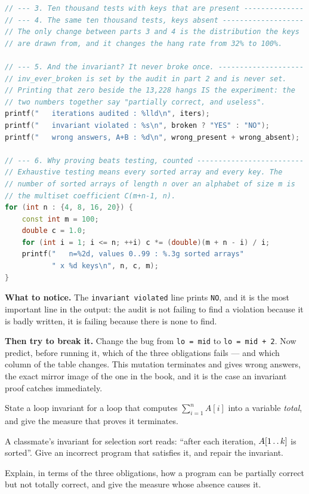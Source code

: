\begin{lab}
\begin{lstlisting}[language=C++]
// --- 3. Ten thousand tests with keys that are present --------------
// --- 4. The same ten thousand tests, keys absent -------------------
// The only change between parts 3 and 4 is the distribution the keys
// are drawn from, and it changes the hang rate from 32% to 100%.

// --- 5. And the invariant? It never broke once. --------------------
// inv_ever_broken is set by the audit in part 2 and is never set.
// Printing that zero beside the 13,228 hangs IS the experiment: the
// two numbers together say "partially correct, and useless".
printf("   iterations audited : %lld\n", iters);
printf("   invariant violated : %s\n", broken ? "YES" : "NO");
printf("   wrong answers, A+B : %d\n", wrong_present + wrong_absent);

// --- 6. Why proving beats testing, counted -------------------------
// Exhaustive testing means every sorted array and every key. The
// number of sorted arrays of length n over an alphabet of size m is
// the multiset coefficient C(m+n-1, n).
for (int n : {4, 8, 16, 20}) {
    const int m = 100;
    double c = 1.0;
    for (int i = 1; i <= n; ++i) c *= (double)(m + n - i) / i;
    printf("   n=%2d, values 0..99 : %.3g sorted arrays"
           " x %d keys\n", n, c, m);
}
\end{lstlisting}

\textbf{What to notice.} The \texttt{invariant violated} line prints
\texttt{NO}, and it is the most important line in the output: the audit is not
failing to find a violation because it is badly written, it is failing because
there is none to find.

\smallskip
\textbf{Then try to break it.} Change the bug from \texttt{lo = mid} to
\texttt{lo = mid + 2}. Now predict, before running it, which of the three
obligations fails --- and which column of the table changes. This mutation
terminates and gives wrong answers, the exact mirror image of the one in the
book, and it is the case an invariant proof catches immediately.
\end{lab}

\begin{checkpoint}
\begin{tightnum}
  \item State a loop invariant for a loop that computes $\sum_{i=1}^{n} A[i]$
        into a variable \textit{total}, and give the measure that proves it
        terminates.
  \item A classmate's invariant for selection sort reads: ``after each
        iteration, $A[1\mathinner{\ldotp\ldotp}k]$ is sorted''. Give an
        incorrect program that satisfies it, and repair the invariant.
  \item Explain, in terms of the three obligations, how a program can be
        partially correct but not totally correct, and give the measure whose
        absence causes it.
\end{tightnum}
\end{checkpoint}

